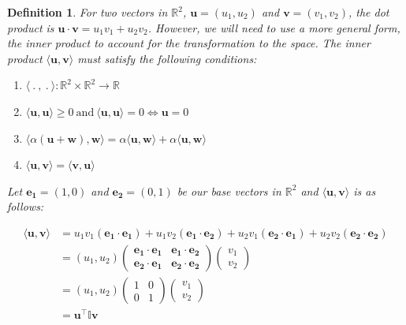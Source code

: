 \documentclass[12pt]{article}
\newtheorem{definition}{Definition}
\begin{document}
	\begin{definition}
		\label{defintion:inner_product}
		For two vectors in $\mathbb{R}^2$, $\bm{u} = (u_1, u_2)$ and $\bm{v} = (v_1, v_2)$, the dot product is $\bm{u} \cdot \bm{v} = u_1v_1 + u_2v_2$. However, we will need to use a more general form, the inner product to account for the transformation to the space. The inner product $\langle \bm{u}, \bm{v} \rangle$ must satisfy the following conditions:
		
		\begin{enumerate} [i]
			\item $\langle ~.~,~.~ \rangle: \mathbb{R}^2 \times \mathbb{R}^2 \rightarrow \mathbb{R}$
			\item $\langle \bm{u}, \bm{u} \rangle \geq 0 ~\text{and}~ \langle \bm{u}, \bm{u} \rangle = 0 \iff \bm{u} = 0$
			\item $\langle \alpha(\bm{u} + \bm{w}), \bm{w} \rangle = \alpha \langle \bm{u}, \bm{w} \rangle + \alpha \langle \bm{u}, \bm{w} \rangle$
			\item $\langle \bm{u}, \bm{v} \rangle = \langle \bm{v}, \bm{u} \rangle$
		\end{enumerate}
		
		\noindent Let $\bm{e_1} = (1, 0)$ and $\bm{e_2} = (0, 1)$ be our base vectors in $\mathbb{R}^2$ and $\langle \bm{u}, \bm{v}\rangle$ is as follows:
		
		\begin{align}
			\langle \bm{u}, \bm{v}\rangle &= u_1v_1(\bm{e_1} \cdot \bm{e_1}) + u_1v_2(\bm{e_1} \cdot \bm{e_2}) + u_2v_1(\bm{e_2} \cdot \bm{e_1}) + u_2v_2(\bm{e_2} \cdot \bm{e_2}) \\ 
			&= (u_1, u_2)
			\begin{pmatrix}
				\label{equation:inner_product_identity}
				\bm{e_1} \cdot \bm{e_1} & \bm{e_1} \cdot \bm{e_2} \\
				\bm{e_2} \cdot \bm{e_1} & \bm{e_2} \cdot \bm{e_2} 
			\end{pmatrix}
			\begin{pmatrix}
				v_1 \\ v_2
			\end{pmatrix} \\
			&= (u_1, u_2) \begin{pmatrix}
				1 & 0 \\
				0 & 1 
			\end{pmatrix}
			\begin{pmatrix}
				v_1 \\ v_2
			\end{pmatrix} \\
			&= \bm{u}^{\intercal}\mathbb{I}\bm{v}
		\end{align}
	\end{definition}
	
\end{document}
